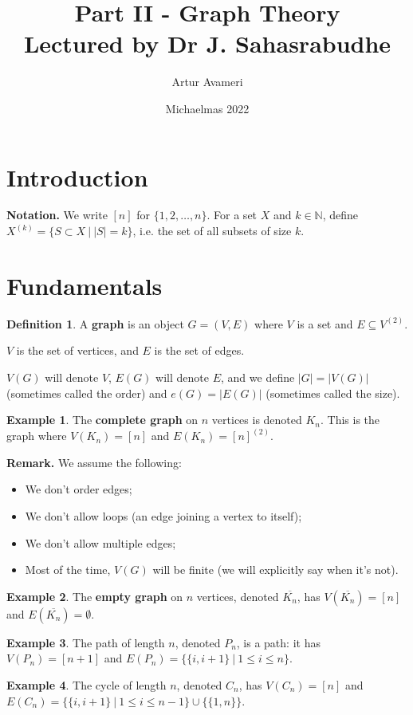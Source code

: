 \documentclass{article}
\title{ Part II - Graph Theory
    \\ \large
    Lectured by Dr J. Sahasrabudhe
}
\author{Artur Avameri}
\date{Michaelmas 2022}
\theoremstyle{definition}
\newtheorem{example}{Example}[section]
\newtheorem{defn}{Definition}[section]
\begin{document}
\maketitle
\tableofcontents
\newpage

\section{Introduction}


\textbf{Notation.} We write $[n]$ for $\{1,2,\ldots, n\}$. For a set $X$ and $k \in \mathbb{N}$, define $X^{(k)} = \{S \subset X ~|~ |S| = k\}$, i.e. the set of all subsets of size $k$.

\section{Fundamentals}

\begin{defn}
    A \textbf{graph} is an object $G = (V, E)$ where $V$ is a set and ${E \subseteq V^{(2)}}$.
\end{defn}

$V$ is the set of vertices, and $E$ is the set of edges.

$V(G)$ will denote $V$, $E(G)$ will denote $E$, and we define $|G| = |V(G)|$ (sometimes called the order) and $e(G)=|E(G)|$ (sometimes called the size).

\begin{example}
    The \textbf{complete graph} on $n$ vertices is denoted $K_n$. This is the graph where $V(K_n) = [n]$ and $E(K_n) = [n]^{(2)}$.
\end{example}

\textbf{Remark.} We assume the following:
\begin{itemize}
    \item We don't order edges;
    \item We don't allow loops (an edge joining a vertex to itself);
    \item We don't allow multiple edges;
    \item Most of the time, $V(G)$ will be finite (we will explicitly say when it's not).
\end{itemize}

\begin{example}
    The \textbf{empty graph} on $n$ vertices, denoted $\overline{K_n}$, has $V(\overline{K_n}) = [n]$ and $E(\overline{K_n})= \emptyset$.
\end{example}
\begin{example}
    The path of length $n$, denoted $P_n$, is a path: it has $V(P_n) = [n+1]$ and $E(P_n) = \{\{i, i+1\} ~|~ 1\le i\le n\}$.
\end{example}
\begin{example}
    The cycle of length $n$, denoted $C_n$, has $V(C_n) = [n]$ and $E(C_n) = \{\{i, i+1\} ~|~ 1\le i \le n-1\} \cup \{\{1,n\}\}$.
\end{example}
\end{document}
